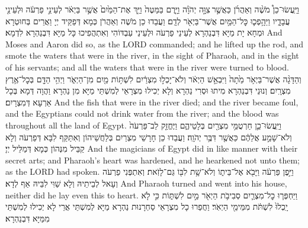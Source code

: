 {%
{וַיַּֽעֲשׂוּ־כֵן֩ מֹשֶׁ֨ה וְאַהֲרֹ֜ן כַּאֲשֶׁ֣ר \legarmeh  צִוָּ֣ה יְהֹוָ֗ה וַיָּ֤רֶם בַּמַּטֶּה֙ וַיַּ֤ךְ אֶת־הַמַּ֙יִם֙ אֲשֶׁ֣ר בַּיְאֹ֔ר לְעֵינֵ֣י פַרְעֹ֔ה וּלְעֵינֵ֖י עֲבָדָ֑יו וַיֵּהָ֥פְכ֛וּ כׇּל־הַמַּ֥יִם אֲשֶׁר־בַּיְאֹ֖ר לְדָֽם׃}
{וַעֲבַדוּ כֵן מֹשֶׁה וְאַהֲרֹן כְּמָא דְּפַקֵּיד יְיָ וַאֲרֵים בְּחוּטְרָא וּמְחָא יָת מַיָּא דִּבְנַהְרָא לְעֵינֵי פַרְעֹה וּלְעֵינֵי עַבְדּוֹהִי וְאִתְהֲפִיכוּ כָּל מַיָּא דִּבְנַהְרָא לִדְמָא׃}
{And Moses and Aaron did so, as the LORD commanded; and he lifted up the rod, and smote the waters that were in the river, in the sight of Pharaoh, and in the sight of his servants; and all the waters that were in the river were turned to blood.}{}
{וְהַדָּגָ֨ה אֲשֶׁר־בַּיְאֹ֥ר מֵ֙תָה֙ וַיִּבְאַ֣שׁ הַיְאֹ֔ר וְלֹא־יָכְל֣וּ מִצְרַ֔יִם לִשְׁתּ֥וֹת מַ֖יִם מִן־הַיְאֹ֑ר וַיְהִ֥י הַדָּ֖ם בְּכׇל־אֶ֥רֶץ מִצְרָֽיִם׃}
{וְנוּנֵי דִּבְנַהְרָא מִיתוּ וּסְרִי נַהְרָא וְלָא יְכִילוּ מִצְרָאֵי לְמִשְׁתֵּי מַיָּא מִן נַהְרָא וַהֲוָה דְּמָא בְּכָל אַרְעָא דְּמִצְרָיִם׃}
{And the fish that were in the river died; and the river became foul, and the Egyptians could not drink water from the river; and the blood was throughout all the land of Egypt.}{}
{וַיַּֽעֲשׂוּ־כֵ֛ן חַרְטֻמֵּ֥י מִצְרַ֖יִם בְּלָטֵיהֶ֑ם וַיֶּחֱזַ֤ק לֵב־פַּרְעֹה֙ וְלֹא־שָׁמַ֣ע אֲלֵהֶ֔ם כַּאֲשֶׁ֖ר דִּבֶּ֥ר יְהֹוָֽה׃
}
{וַעֲבַדוּ כֵן חָרָשֵׁי מִצְרַיִם בְּלַחֲשֵׁיהוֹן וְאִתַּקַּף לִבָּא דְּפַרְעֹה וְלָא קַבֵּיל מִנְּהוֹן כְּמָא דְּמַלֵּיל יְיָ׃}
{And the magicians of Egypt did in like manner with their secret arts; and Pharaoh’s heart was hardened, and he hearkened not unto them; as the LORD had spoken.}{}
{וַיִּ֣פֶן פַּרְעֹ֔ה וַיָּבֹ֖א אֶל־בֵּית֑וֹ וְלֹא־שָׁ֥ת לִבּ֖וֹ גַּם־לָזֹֽאת׃
}
{וְאִתְפְּנִי פַרְעֹה וְעָאל לְבֵיתֵיהּ וְלָא שַׁוִּי לִבֵּיהּ אַף לְדָא׃}
{And Pharaoh turned and went into his house, neither did he lay even this to heart.}{}
{וַיַּחְפְּר֧וּ כׇל־מִצְרַ֛יִם סְבִיבֹ֥ת הַיְאֹ֖ר מַ֣יִם לִשְׁתּ֑וֹת כִּ֣י לֹ֤א יָֽכְלוּ֙ לִשְׁתֹּ֔ת מִמֵּימֵ֖י הַיְאֹֽר׃}
{וַחֲפַרוּ כָל מִצְרָאֵי סַחְרָנוּת נַהְרָא מַיָּא לְמִשְׁתֵּי אֲרֵי לָא יְכִילוּ לְמִשְׁתֵּי מִמַּיָּא דִּבְנַהְרָא׃}
}
